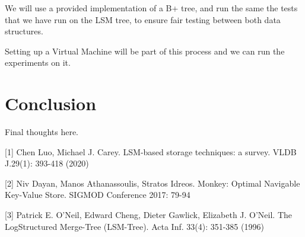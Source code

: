 \documentclass[sigconf]{acmart}
\begin{document}
    We will use a provided implementation of a B+ tree, and run the same the tests that we have run on the LSM tree, to ensure fair testing between both data structures.

    Setting up a Virtual Machine will be part of this process and we can run the experiments on it.

    \section{Conclusion}

    Final thoughts here.

        {
        
        

        [1] Chen Luo, Michael J. Carey. LSM-based storage techniques: a survey. VLDB J.29(1): 393-418 (2020)

        [2] Niv Dayan, Manos Athanassoulis, Stratos Idreos. Monkey: Optimal Navigable
        Key-Value Store. SIGMOD Conference 2017: 79-94

        [3] Patrick E. O'Neil, Edward Cheng, Dieter Gawlick, Elizabeth J. O'Neil. The LogStructured Merge-Tree (LSM-Tree). Acta Inf. 33(4): 351-385 (1996)
    }
\end{document}
